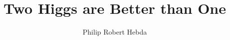 \documentclass[12pt,lot, lof]{puthesis}
\title{Two Higgs are Better than One}
\author{Philip Robert Hebda}
\begin{document}
\makefrontmatter


\newcommand{\Hgg}{\ensuremath{H\to\gamma\gamma}}
\newcommand{\Hbb}{\ensuremath{H\to b\bar{b}}}
\newcommand{\ggbb}{\ensuremath{\gamma\gamma b\bar{b}}}
\newcommand{\ggjj}{\ensuremath{\gamma\gamma jj}}
\newcommand{\gjjj}{\ensuremath{\gamma jjj}}
\newcommand{\Mgg}{\ensuremath{m_{\gamma\gamma}}}
\newcommand{\Mjj}{\ensuremath{m_{\rm jj}}}
\newcommand{\Mjjr}{\ensuremath{m_{\rm jj}^{\rm r}}}
\newcommand{\thetastar}{\ensuremath{\theta^{\rm CS}_{\rm HH}}}
\newcommand{\acosthetastar}{\ensuremath{|\cos {\theta^{\rm CS}_{\rm HH}}|}}
\newcommand{\Mggjj}{\ensuremath{m_{\gamma\gamma {\rm jj}}}}
\newcommand{\Mggjjk}{\ensuremath{m_{\gamma\gamma {\rm jj}}^{\rm kin}}}
\newcommand{\Mggjjrk}{\ensuremath{m_{\gamma\gamma {\rm jj}}^{\rm r, kin}}}
\newcommand{\pTj}{\ensuremath{p_{T, {\rm jet}}}}
\newcommand{\pTjr}{\ensuremath{p_{T, {\rm jet}}^r}}
\newcommand{\kapt}{\ensuremath{\kappa_{t}}}
\newcommand{\kapl}{\ensuremath{\kappa_{\lambda}}}
\newcommand{\ctwo}{\ensuremath{c_2}}
\newcommand{\sieie}{\ensuremath{\sigma_{i\eta i\eta}}}
\newcommand{\met}{\ensuremath{{\not\mathrel{E}}_{\text{T}}}}







%






\appendix %
%
%

\singlespacing


\cleardoublepage
\ifdefined{}
\else
\fi
{}


\end{document}
